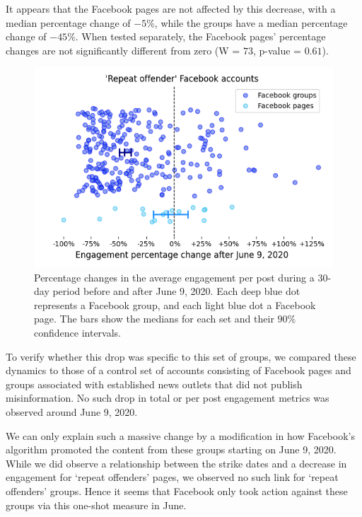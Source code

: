 \documentclass[11pt,a4paper]{article}
\begin{document}
It appears that the Facebook pages are not affected by this decrease, with a median percentage change of $-5\%$, while the groups have a median percentage change of $-45\%$. 
When tested separately, the Facebook pages' percentage changes are not significantly different from zero (W = $73$, p-value = $0.61$).

\begin{figure}[!h]
\centering
\includegraphics[width=\linewidth]{./../figure/repeat_june_drop_percentage_change.png}
\caption{Percentage changes in the average engagement per post during a 30-day period before and after June 9, 2020. 
Each deep blue dot represents a Facebook group, and each light blue dot a Facebook page.
The bars show the medians for each set and their $90\%$ confidence intervals.
}
\label{repeat_june_drop_percentage_change}
\end{figure}

To verify whether this drop was specific to this set of groups, we compared these dynamics to those of a control set of accounts consisting of Facebook pages and groups associated with established news outlets that did not publish misinformation.
No such drop in total or per post engagement metrics was observed around June 9, 2020.

We can only explain such a massive change by a modification in how Facebook’s algorithm promoted the content from these groups starting on June 9, 2020.
While we did observe a relationship between the strike dates and a decrease in engagement for `repeat offenders' pages, we observed no such link for `repeat offenders' groups.
Hence it seems that Facebook only took action against these groups via this one-shot measure in June.
\end{document}
